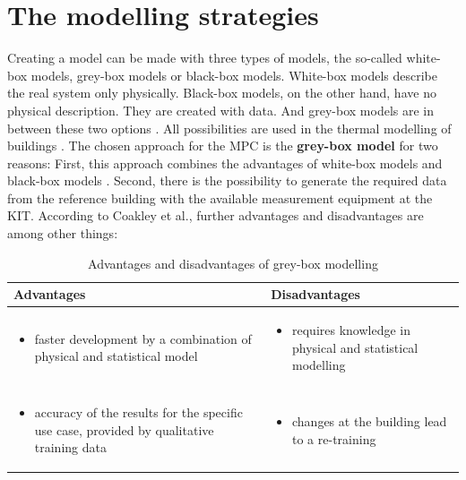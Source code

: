     \section{The modelling strategies}
    \label{ModellingStrategies}
    Creating a model can be made with three types of models, the so-called white-box models, grey-box models or black-box models. White-box models describe the real system only physically. Black-box models, on the other hand, have no physical description. They are created with data. And grey-box models are in between these two options \cite{Statusseminar.ForschungfurEnergieoptimiertesBauen.2009}. All possibilities are used in the thermal modelling of buildings \cite{Kramer.2012}.
    \newline
    The chosen approach for the MPC is the \textbf{grey-box model} for two reasons: First, this approach combines the advantages of white-box models and black-box models \cite{EstradaFlores.2006}. Second, there is the possibility to generate the required data from the reference building with the available measurement equipment at the KIT. According to Coakley et al., further advantages and disadvantages are among other things\cite{Coakley.2014}:
    \begin{table}[h!]
    \label{Advantages and disadvantages of grey-box modelling}
        \centering
        \begin{tabular}{p{7.3cm} | p{7.3cm}}
        \hline
          Advantages  &  Disadvantages\\
        \hline
        \begin{itemize}
            \item faster development by a combination of physical and statistical model
        \end{itemize}
      & \begin{itemize}
            \item requires knowledge in physical and statistical modelling 
        \end{itemize}\\
     \begin{itemize}
            \item accuracy of the results for the specific use case, provided by qualitative training data
        \end{itemize} & \begin{itemize}
            \item changes at the building lead to a re-training
        \end{itemize}\\
        \end{tabular}
        \caption {Advantages and disadvantages of grey-box modelling}
    \end{table}
